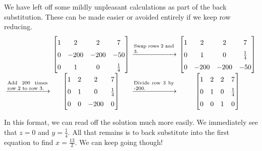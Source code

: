 \begin{example}
	We have left off some mildly unpleasant calculations as part of the back substitution. These can be made easier or avoided entirely if we keep row reducing. 
	\[
		\setlength{\tabcolsep}{2pt}
		\renewcommand{\arraystretch}{1.5}
		\begin{tabular}{rccc}
			&
			$\begin{bmatrix}
				1 & 2 & 2 & 7\\
				0 & -200 & -200 & -50\\
				0& 1 & 0 & \frac{1}{4}
			\end{bmatrix}$
			&
			$\xrightarrow{\begin{minipage}{0.17\textwidth} \scriptsize Swap rows 2 and 3.
			\end{minipage}}$
			&
			$\begin{bmatrix}
				1 & 2 & 2 & 7\\
				0& 1 & 0 & \frac{1}{4}\\
				0 & -200 & -200 & -50
			\end{bmatrix}$
			\\
			$\xrightarrow{\begin{minipage}{0.17\textwidth} \scriptsize Add 200 times row 2 to row 3.
			\end{minipage}}$
			&
			$\begin{bmatrix}
				1 & 2 & 2 & 7\\
				0& 1 & 0 & \frac{1}{4}\\
				0 & 0 & -200 & 0
			\end{bmatrix}$
			&
			$\xrightarrow{\begin{minipage}{0.17\textwidth} \scriptsize Divide row 3 by -200.
			\end{minipage}}$
			&
			$\begin{bmatrix}
				1 & 2 & 2 & 7\\
				0& 1 & 0 & \frac{1}{4}\\
				0 & 0 & 1 & 0
			\end{bmatrix}$
		\end{tabular}
	\]
	
	In this format, we can read off the solution much more easily. We immediately see that $z = 0$ and $y = \frac{1}{4}$. All that remains is to back substitute into the first equation to find $x = \frac{13}{2}$. We can keep going though!
	

\end{example}
